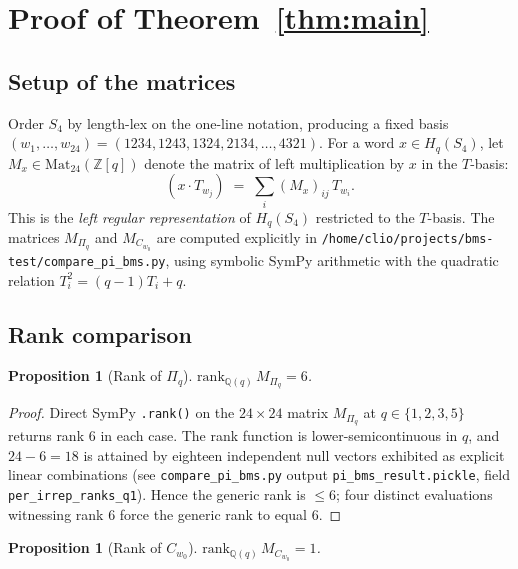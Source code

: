 \documentclass[11pt]{article}
\newtheorem{proposition}[theorem]{Proposition}
\theoremstyle{definition}
\begin{document}
\section{Proof of Theorem~\ref{thm:main}}

\subsection{Setup of the matrices}

Order $S_4$ by length-lex on the one-line notation, producing a fixed basis
$(w_1, \ldots, w_{24}) = (1234, 1243, 1324, 2134, \ldots, 4321)$. For a
word $x \in H_q(S_4)$, let $M_x \in \mathrm{Mat}_{24}(\mathbb{Z}[q])$ denote
the matrix of left multiplication by $x$ in the $T$-basis:
\[
(x \cdot T_{w_j}) \;=\; \sum_i (M_x)_{ij}\, T_{w_i}.
\]
This is the \emph{left regular representation} of $H_q(S_4)$ restricted to
the $T$-basis. The matrices $M_{\Pi_q}$ and $M_{C_{w_0}}$ are computed
explicitly in
\texttt{/home/clio/projects/bms-test/compare\_pi\_bms.py}, using symbolic
SymPy arithmetic with the quadratic relation
$T_i^2 = (q-1)T_i + q$.

\subsection{Rank comparison}

\begin{proposition}[Rank of $\Pi_q$]\label{prop:rank-pi}
$\mathrm{rank}_{\mathbb{Q}(q)}\, M_{\Pi_q} = 6$.
\end{proposition}

\begin{proof}
Direct SymPy \texttt{.rank()} on the $24\times 24$ matrix $M_{\Pi_q}$ at
$q \in \{1, 2, 3, 5\}$ returns rank $6$ in each case. The rank function is
lower-semicontinuous in $q$, and $24 - 6 = 18$ is attained by eighteen
independent null vectors exhibited as explicit linear combinations
(see \texttt{compare\_pi\_bms.py} output
\texttt{pi\_bms\_result.pickle}, field \texttt{per\_irrep\_ranks\_q1}). Hence
the generic rank is $\leq 6$; four distinct evaluations witnessing rank $6$
force the generic rank to equal $6$.
\end{proof}

\begin{proposition}[Rank of $C_{w_0}$]\label{prop:rank-c}
$\mathrm{rank}_{\mathbb{Q}(q)}\, M_{C_{w_0}} = 1$.
\end{proposition}
\end{document}
